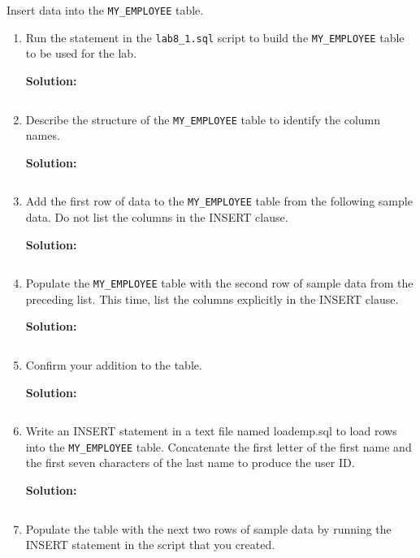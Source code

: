 Insert data into the \texttt{MY\_EMPLOYEE} table.
\begin{enumerate}
    \item Run the statement in the \texttt{lab8\_1.sql} script to build the \texttt{MY\_EMPLOYEE} table to be used for the lab.
    
    \textbf{Solution: }
    \begin{lstlisting}[language=SQL]
    \end{lstlisting}
    \item Describe the structure of the \texttt{MY\_EMPLOYEE} table to identify the column names. 
    
    \textbf{Solution: }
    \begin{lstlisting}[language=SQL]
    \end{lstlisting}
    \item  Add the first row of data to the \texttt{MY\_EMPLOYEE} table from the following sample data. Do not list the
columns in the INSERT clause.   
    
    \textbf{Solution: }
    \begin{lstlisting}[language=SQL]
    \end{lstlisting}
    \item  Populate the \texttt{MY\_EMPLOYEE} table with the second row of sample data from the preceding list. This
time, list the columns explicitly in the INSERT clause.  
    
    \textbf{Solution: }
    \begin{lstlisting}[language=SQL]
    \end{lstlisting}
    \item  Confirm your addition to the table.   
    
    \textbf{Solution: }
    \begin{lstlisting}[language=SQL]
    \end{lstlisting}
    \item  Write an INSERT statement in a text file named loademp.sql to load rows into the
\texttt{MY\_EMPLOYEE} table. Concatenate the first letter of the first name and the first seven characters of
the last name to produce the user ID.  
    
    \textbf{Solution: }
    \begin{lstlisting}[language=SQL]
    \end{lstlisting}
    \item  Populate the table with the next two rows of sample data by running the INSERT statement in the
script that you created. 
    

\end{enumerate}
